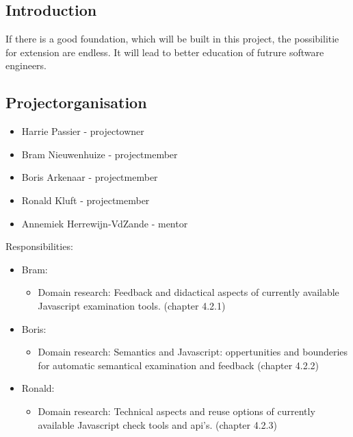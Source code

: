 \documentclass{article}
\begin{document}
\subsection{Introduction}

If there is a good foundation, which will be built in this project, the possibilitie for extension are endless. It will lead to better education of futrure software engineers.  

\subsection{Projectorganisation}

\begin{itemize}
  \item Harrie Passier - projectowner
  \item Bram Nieuwenhuize - projectmember
  \item Boris Arkenaar - projectmember
  \item Ronald Kluft - projectmember
  \item Annemiek Herrewijn-VdZande - mentor
\end{itemize}

Responsibilities:
\begin{itemize}
  \item Bram: 
	\begin{itemize}
	\item Domain research: Feedback and didactical aspects of currently available Javascript examination tools. (chapter 4.2.1)
	\end{itemize}
  \item Boris:
	\begin{itemize}
	\item Domain research: Semantics and Javascript: oppertunities and bounderies for automatic semantical examination and feedback (chapter 4.2.2)
	\end{itemize}
  \item Ronald:
	\begin{itemize}
	\item Domain research: Technical aspects and reuse options of currently available Javascript check tools and api's. (chapter 4.2.3)
	\end{itemize}
\end{itemize}
\end{document}
